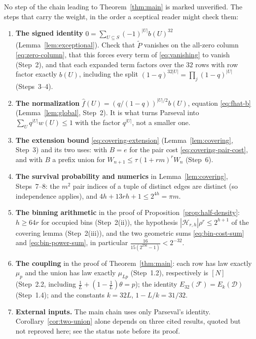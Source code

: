 \documentclass[11pt,letterpaper]{article}
\theoremstyle{definition}
\theoremstyle{remark}
\numberwithin{equation}{section}
\begin{document}
No step of the chain leading to Theorem~\ref{thm:main} is marked
unverified. The steps that carry the weight, in the order a sceptical
reader might check them:

\begin{enumerate}[label=\arabic*.]
\item \textbf{The signed identity}
$0=\sum_{U\subseteq S}(-1)^{|U|}b(U)^{32}$
(Lemma~\ref{lem:exceptional}). Check that $\widetilde P$ vanishes on the
all-zero column \eqref{eq:zero-column}, that this forces every term of
\eqref{eq:vanishing} to vanish (Step~2), and that each expanded term
factors over the $32$ rows with row factor exactly $b(U)$, including the
split $(1-q)^{32|U|}=\prod_j(1-q)^{|U|}$ (Steps~3--4).
\item \textbf{The normalization}
$\widehat f(U)=(q/(1-q))^{|U|/2}b(U)$, equation \eqref{eq:fhat-b}
(Lemma~\ref{lem:global}, Step~2). It is what turns Parseval into
$\sum_Uq^{|U|}w(U)\le1$ with the factor $q^{|U|}$, not a smaller one.
\item \textbf{The extension bound} \eqref{eq:covering-extension}
(Lemma~\ref{lem:covering}, Step~3) and its two uses: with $B=e$ for the
pair cost \eqref{eq:covering-pair-cost}, and with $B$ a prefix union for
$W_{n+1}\le\tau(1+rm)^rW_n$ (Step~6).
\item \textbf{The survival probability and numerics} in
Lemma~\ref{lem:covering}, Steps~7--8: the $m^2$ pair indices of a tuple of
distinct edges are distinct (so independence applies), and
$4h+13rh+1\le2^{4h}=\pi m$.
\item \textbf{The binning arithmetic} in the proof of
Proposition~\ref{prop:half-density}: $h\ge64r$ for occupied bins
(Step~2(ii)), the hypothesis $|\mathcal H_{r,h}|\rho^r\le2^{h+1}$ of the
covering lemma (Step~2(iii)), and the two geometric sums
\eqref{eq:bin-cost-sum} and \eqref{eq:bin-power-sum}, in particular
$\frac{16}{15(2^{256}-1)}<2^{-32}$.
\item \textbf{The coupling} in the proof of Theorem~\ref{thm:main}: each
row has law exactly $\mu_p$ and the union has law exactly $\mu_{Lp}$
(Step~1.2), respectively is $[N]$ (Step~2.2, including
$\tfrac1L+(1-\tfrac1L)\theta=p$); the identity
$E_{32}(\mathcal F)=E_k(\mathcal D)$ (Step~1.4); and the constants
$k=32L$, $1-L/k=31/32$.
\item \textbf{External inputs.} The main chain uses only Parseval's
identity. Corollary~\ref{cor:two-union} alone depends on three cited
results, quoted but not reproved here; see the status note before its
proof.
\end{enumerate}
\end{document}
